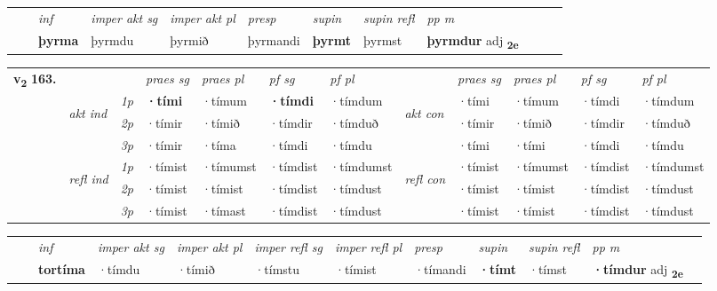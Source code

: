 \begin{tabular}{llllllllllll}
 & & \textit{inf} & \textit{imper akt sg} & \textit{imper akt pl}   & \textit{presp} & \textit{supin} & \textit{supin refl} & \textit{pp m}     \\*
  & & \textbf{þyrma} & þyrmdu  & þyrmið   & þyrmandi &  \textbf{þyrmt} & þyrmst & \textbf{þyrmdur} adj \textbf{\textsubscript{2e}} \\*
\cmidrule{1-12}
\end{tabular}



\begin{tabular}{llllllllllll} \toprule
\multirow{4}{*}{{{\textbf{v{\textsubscript{2}}} \Large{\textbf{163.}}}}}  & &   &  \textit{praes sg}  & \textit{praes pl}  &\textit{ pf sg} & \textit{pf pl} &  &  \textit{praes sg}  & \textit{praes pl}  & \textit{pf sg} & \textit{pf pl } \\*
	\cmidrule{4-7} \cmidrule{9-12}
 & \multirow{3}{*}{\begin{turn}{90}\textit{akt ind}\end{turn}} & {\textit{1p}} & \textbf{·tími} & ·tímum    & \textbf{·tímdi} & ·tímdum & \multirow{3}{*}{\begin{turn}{90}\textit{akt con}\end{turn}} &·tími & ·tímum & ·tímdi & ·tímdum\\*
& &  {\textit{2p}} &  ·tímir  & ·tímið   & ·tímdir & ·tímduð & & ·tímir & ·tímið & ·tímdir & ·tímduð \\*
& &  {\textit{3p}} & ·tímir & ·tíma   & ·tímdi & ·tímdu & & ·tími & ·tími& ·tímdi & ·tímdu  \\*
\cmidrule{4-7} \cmidrule{9-12}
 &\multirow{3}{*}{\begin{turn}{90}\textit{refl ind}\end{turn}} & {\textit{1p}} & ·tímist & ·tímumst    & ·tímdist & ·tímdumst & \multirow{3}{*}{\begin{turn}{90}\textit{refl con}\end{turn}}  &·tímist & ·tímumst & ·tímdist & ·tímdumst\\*
 &&  {\textit{2p}} &  ·tímist  & ·tímist   & ·tímdist & ·tímdust & &·tímist & ·tímist & ·tímdist & ·tímdust \\*
& &  {\textit{3p}} & ·tímist & ·tímast   & ·tímdist & ·tímdust & & ·tímist & ·tímist& ·tímdist & ·tímdust  \\*
\cmidrule{4-7} \cmidrule{9-12}
\end{tabular}


\begin{tabular}{llllllllllll}
 & & \textit{inf} & \textit{imper akt sg} & \textit{imper akt pl} & \textit{imper refl sg} & \textit{imper refl pl} & \textit{presp} & \textit{supin} & \textit{supin refl} & \textit{pp m}     \\*
  & & \textbf{tortíma} & ·tímdu  & ·tímið & ·tímstu & ·tímist & ·tímandi &  \textbf{·tímt} & ·tímst & \textbf{·tímdur} adj \textbf{\textsubscript{2e}} \\*
\cmidrule{1-12}
\end{tabular}



